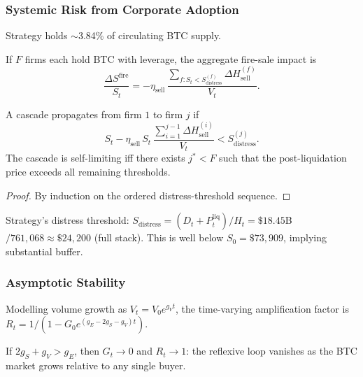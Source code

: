 \subsubsection{Systemic Risk from Corporate Adoption}

Strategy holds $\sim$3.84\% of circulating BTC supply.

\begin{proposition}\label{prop:fire_sale}
  If $F$ firms each hold BTC with leverage, the aggregate fire-sale impact is
  \begin{equation}
    \frac{\Delta S^{\mathrm{fire}}}{S_t}
    = -\eta_{\mathrm{sell}}\,
    \frac{\sum_{f: S_t < S^{(f)}_{\mathrm{distress}}} \Delta H^{(f)}_{\mathrm{sell}}}{V_t}.
  \end{equation}
\end{proposition}

\begin{theorem}\label{thm:contagion}
  A cascade propagates from firm $1$ to firm $j$ if
  \begin{equation}
    S_t - \eta_{\mathrm{sell}}\,S_t\,
    \frac{\sum_{i=1}^{j-1} \Delta H^{(i)}_{\mathrm{sell}}}{V_t}
    < S^{(j)}_{\mathrm{distress}}.
  \end{equation}
  The cascade is self-limiting iff there exists $j^* < F$ such that the
  post-liquidation price exceeds all remaining thresholds.
\end{theorem}

\begin{proof}
  By induction on the ordered distress-threshold sequence.
\end{proof}

Strategy's distress threshold: $S_{\mathrm{distress}} = (D_t + P_t^{\mathrm{liq}})/H_t
= \$18.45$B$/761{,}068 \approx \$24{,}200$ (full stack).  This is well below
$S_0 = \$73{,}909$, implying substantial buffer.

\subsubsection{Asymptotic Stability}

Modelling volume growth as $V_t = V_0 e^{g_V t}$, the time-varying
amplification factor is $R_t = 1/(1 - G_0 e^{(g_E - 2g_S - g_V)t})$.

\begin{corollary}\label{cor:asymptotic}
  If $2g_S + g_V > g_E$, then $G_t \to 0$ and $R_t \to 1$: the reflexive
  loop vanishes as the BTC market grows relative to any single buyer.
\end{corollary}
